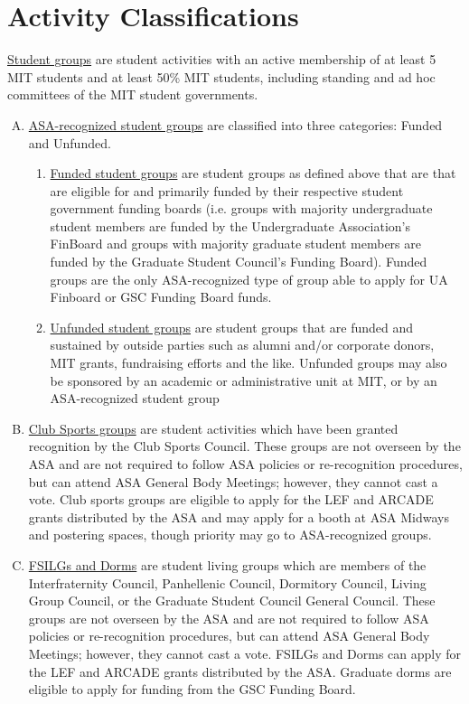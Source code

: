 \documentclass[12pt]{article}
\begin{document}
\section{Activity Classifications}
\ul{Student groups} are student activities with an active membership of at least 5 MIT students and at
least 50\% MIT students, including standing and ad hoc committees of the MIT student governments.
\begin{enumerate}[A.]
    \item \ul{ASA-recognized student groups} are classified into three categories: Funded and Unfunded.
    \begin{enumerate}[noitemsep, label=\arabic*.]
        \item \ul{Funded student groups} are student groups as defined above that are that are eligible
for and primarily funded by their respective student government funding boards (i.e.
groups with majority undergraduate student members are funded by the
Undergraduate Association’s FinBoard and groups with majority graduate student
members are funded by the Graduate Student Council’s Funding Board). Funded
groups are the only ASA-recognized type of group able to apply for UA Finboard or
GSC Funding Board funds.

        \item \ul{Unfunded student groups} are student groups that are funded and sustained by
outside parties such as alumni and/or corporate donors, MIT grants, fundraising
efforts and the like. Unfunded groups may also be sponsored by an academic or
administrative unit at MIT, or by an ASA-recognized student group
    \end{enumerate}

    \item \ul{Club Sports groups} are student activities which have been granted recognition by the Club Sports
Council. These groups are not overseen by the ASA and are not required to follow ASA policies or
re-recognition procedures, but can attend ASA General Body Meetings; however, they cannot cast a
vote. Club sports groups are eligible to apply for the LEF and ARCADE grants distributed by the ASA and
may apply for a booth at ASA Midways and postering spaces, though priority may go to ASA-recognized
groups.

    \item  \ul{FSILGs and Dorms} are student living groups which are members of the Interfraternity Council,
Panhellenic Council, Dormitory Council, Living Group Council, or the Graduate Student Council General
Council. These groups are not overseen by the ASA and are not required to follow ASA policies or
re-recognition procedures, but can attend ASA General Body Meetings; however, they cannot cast a
vote. FSILGs and Dorms can apply for the LEF and ARCADE grants distributed by the ASA. Graduate
dorms are eligible to apply for funding from the GSC Funding Board.
\end{enumerate}
\end{document}
